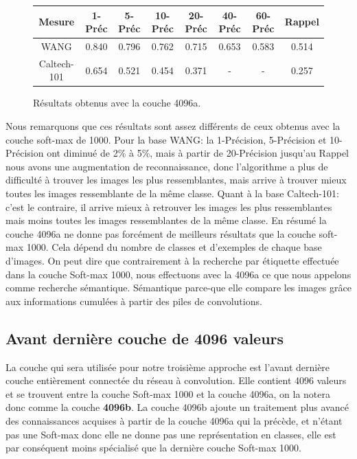 \begin{figure}[H]
\begin{center}
\begin{tabular}{|c|c|c|c|c|c|c|c|}
\hline
	Mesure & 1-Préc & 5-Préc & 10-Préc & 20-Préc & 40-Préc & 60-Préc & Rappel\\
\hline
	WANG & 0.840 & 0.796 & 0.762 & 0.715 & 0.653 & 0.583 & 0.514\\
\hline
	Caltech-101 & 0.654 & 0.521 & 0.454 & 0.371 & - & - & 0.257\\
\hline
\end{tabular}
\end{center}
\caption{Résultats obtenus avec la couche 4096a.}
\end{figure}

	Nous remarquons que ces résultats sont assez différents de ceux obtenus avec la couche soft-max de 1000. Pour la base WANG: la 1-Précision, 5-Précision et 10-Précision ont diminué de 2\% à 5\%, mais à partir de 20-Précision jusqu'au Rappel nous avons une augmentation de reconnaissance, donc l'algorithme a plus de difficulté à trouver les images les plus ressemblantes, mais arrive à trouver mieux toutes les images ressemblante de la même classe.
	Quant à la base Caltech-101: c'est le contraire, il arrive mieux à retrouver les images les plus ressemblantes mais moins toutes les images ressemblantes de la même classe.
	En résumé la couche 4096a ne donne pas forcément de meilleurs résultats que la couche soft-max 1000. Cela dépend du nombre de classes et d'exemples de chaque base d'images. On peut dire que contrairement à la recherche par étiquette effectuée dans la couche Soft-max 1000, nous effectuons avec la 4096a ce que nous appelons comme recherche sémantique. Sémantique parce-que elle compare les images grâce aux informations cumulées à partir des piles de convolutions.


\subsection{Avant dernière couche de 4096 valeurs}
	La couche qui sera utilisée pour notre troisième approche est l'avant dernière couche entièrement connectée du réseau à convolution. Elle contient 4096 valeurs et se trouvent entre la couche Soft-max 1000 et la couche 4096a, on la notera donc comme la couche \textbf{4096b}.
	La couche 4096b ajoute un traitement plus avancé des connaissances acquises à partir de la couche 4096a qui la précède, et n'étant pas une Soft-max donc elle ne donne pas une représentation en classes, elle est par conséquent moins spécialisé que la dernière couche Soft-max 1000.


